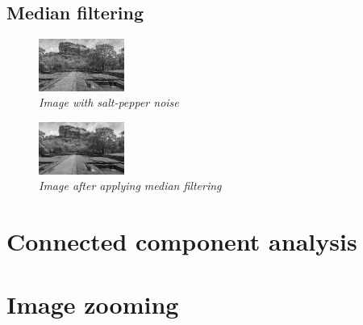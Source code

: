 \documentclass[11pt,twocolumn]{article}
\begin{document}
\subsection{Median filtering}
\begin{figure}[H]
\center
\includegraphics[width=0.25\textwidth]{Salt_Image.png}
\caption{{\small \textit{Image with salt-pepper noise}}}
\end{figure}
\begin{figure}[H]
\center
\includegraphics[width=0.25\textwidth]{Median_filt_Image.png}
\caption{{\small \textit{Image after applying median filtering}}}
\end{figure}

\section{Connected component analysis}

\section{Image zooming}
\end{document}
